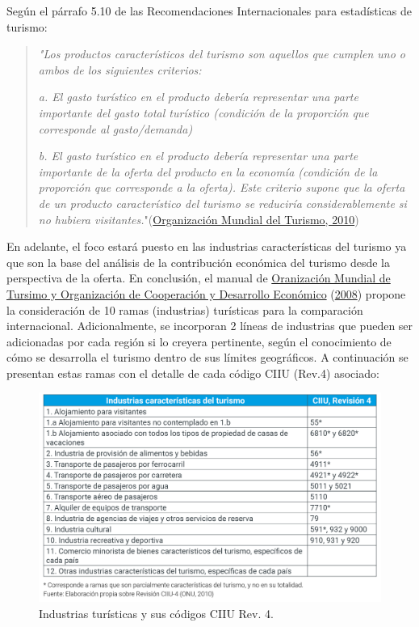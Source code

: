 \documentclass[
  openany]{book}
\begin{document}
Según el párrafo 5.10 de las Recomendaciones Internacionales para estadísticas de turismo:

\begin{quote}
\emph{"Los productos característicos del turismo son aquellos que cumplen uno o ambos de los siguientes criterios:}

\emph{a. El gasto turístico en el producto debería representar una parte importante del gasto total turístico (condición de la proporción que corresponde al gasto/demanda)}

\emph{b. El gasto turístico en el producto debería representar una parte importante de la oferta del producto en la economía (condición de la proporción que corresponde a la oferta). Este criterio supone que la oferta de un producto característico del turismo se reduciría considerablemente si no hubiera visitantes.}"(\protect\hyperlink{ref-riet2008}{Organización Mundial del Turismo, 2010})
\end{quote}

En adelante, el foco estará puesto en las industrias características del turismo ya que son la base del análisis de la contribución económica del turismo desde la perspectiva de la oferta. En conclusión, el manual de \protect\hyperlink{ref-cstrmc2008}{Oranización Mundial de Tursimo y Organización de Cooperación y Desarrollo Económico} (\protect\hyperlink{ref-cstrmc2008}{2008}) propone la consideración de 10 ramas (industrias) turísticas para la comparación internacional. Adicionalmente, se incorporan 2 líneas de industrias que pueden ser adicionadas por cada región si lo creyera pertinente, según el conocimiento de cómo se desarrolla el turismo dentro de sus límites geográficos. A continuación se presentan estas ramas con el detalle de cada código CIIU (Rev.4) asociado:

\begin{figure}

{\centering \includegraphics[width=1\linewidth]{imagenes/figura1.2} 

}

\caption{Industrias turísticas y sus códigos CIIU Rev. 4.}\label{fig:ciiu2}
\end{figure}
\end{document}
